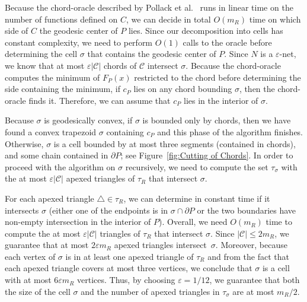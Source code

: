 \documentclass[a4paper,UKenglish]{lipics}
\newcommand{\F}[2]{\ensuremath{F_{\scriptscriptstyle #1}(#2)}}
\newcommand{\cp}{\ensuremath{c_P}}
\newcommand{\m}{\ensuremath{m_{\scriptscriptstyle R}}}
\newcommand{\cell}{\ensuremath{\sigma}}
\begin{document}
Because the chord-oracle described by Pollack et al.~\cite[Section~3]{pollackComputingCenter} runs in linear time on the number of functions defined on $C$, we can decide in total $O(\m)$ time on which side of $C$ the geodesic center of $P$ lies. 
Since our decomposition into cells has constant complexity, 
we need to perform $O(1)$ calls to the oracle before determining the cell $\cell$ that contains the geodesic center of $P$. 
Since $N$ is a $\varepsilon$-net, we know that at most $\varepsilon |\mathcal C|$ chords of $\mathcal C$ intersect $\cell$.
Because the chord-oracle computes the minimum of $\F{P}{x}$ restricted to the chord before determining the side containing the minimum, if $\cp$ lies on any chord bounding $\cell$, then the chord-oracle finds it. 
Therefore, we can assume that $\cp$ lies in the interior of $\cell$.

Because $\cell$ is geodesically convex, 
if $\cell$ is bounded only by chords, then we have found a convex trapezoid $\cell$ containing $\cp$ and this phase of the algorithm finishes. 
Otherwise, $\cell$ is a cell bounded by at most three segments (contained in chords), and some chain contained in $\partial P$; see Figure~\ref{fig:Cutting of Chords}. 
In order to proceed with the algorithm on  $\cell$ recursively, we need to compute the set $\tau_{\cell}$ with the at most $\varepsilon |\mathcal C|$ apexed triangles of $\tau_R$ that intersect $\cell$. 

For each apexed triangle $\triangle\in \tau_R$, we can determine in constant time if it intersects $\cell$ (either one of the endpoints is in $\cell\cap \partial P$ or the two boundaries have non-empty intersection in the interior of $P$). 
Overall, we need $O(\m)$ time to compute the at most $\varepsilon |\mathcal C|$ triangles of $\tau_R$ that intersect $\cell$.
Since $|\mathcal C| \leq 2\m$, we guarantee that at most $2\varepsilon \m$ apexed triangles intersect~$\cell$. 
Moreover, because each vertex of $\cell$ is in at least one apexed triangle of $\tau_R$ and from the fact that each apexed triangle covers at most three vertices, we conclude that $\cell$ is a cell with at most $6 \varepsilon \m$ vertices. 
Thus, by choosing $\varepsilon = 1/12$, we guarantee that both the size of the cell $\cell$ and the number of apexed triangles in $\tau_{\cell}$ are at most $\m/2$.
\end{document}
